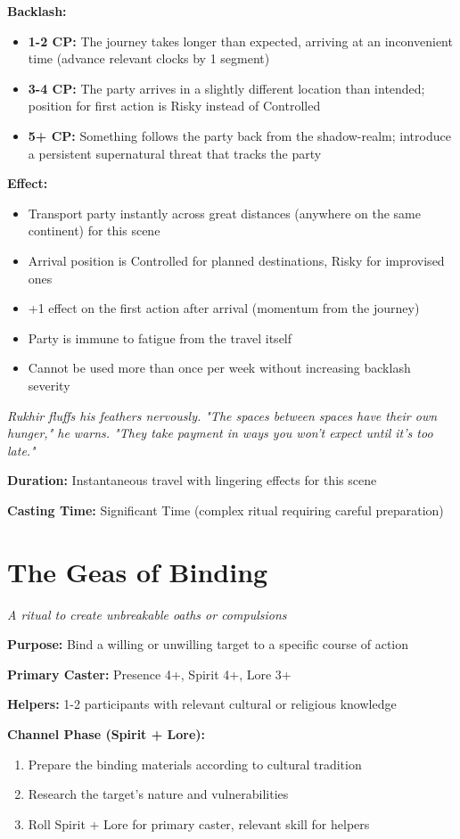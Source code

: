 \documentclass[12pt,twoside]{book}
\newcommand{\shadow}[1]{\textit{#1}}
\begin{document}
\textbf{Backlash:}
\begin{itemize}
\item \textbf{1-2 CP:} The journey takes longer than expected, arriving at an inconvenient time (advance relevant clocks by 1 segment)
\item \textbf{3-4 CP:} The party arrives in a slightly different location than intended; position for first action is Risky instead of Controlled
\item \textbf{5+ CP:} Something follows the party back from the shadow-realm; introduce a persistent supernatural threat that tracks the party
\end{itemize}

\textbf{Effect:}
\begin{itemize}
\item Transport party instantly across great distances (anywhere on the same continent) for this scene
\item Arrival position is Controlled for planned destinations, Risky for improvised ones
\item +1 effect on the first action after arrival (momentum from the journey)
\item Party is immune to fatigue from the travel itself
\item Cannot be used more than once per week without increasing backlash severity
\end{itemize}

\shadow{Rukhir fluffs his feathers nervously. "The spaces between spaces have their own hunger," he warns. "They take payment in ways you won't expect until it's too late."}

\textbf{Duration:} Instantaneous travel with lingering effects for this scene

\textbf{Casting Time:} Significant Time (complex ritual requiring careful preparation)

\section*{The Geas of Binding}
\textit{A ritual to create unbreakable oaths or compulsions}

\textbf{Purpose:} Bind a willing or unwilling target to a specific course of action

\textbf{Primary Caster:} Presence 4+, Spirit 4+, Lore 3+

\textbf{Helpers:} 1-2 participants with relevant cultural or religious knowledge

\textbf{Channel Phase (Spirit + Lore):}
\begin{enumerate}
\item Prepare the binding materials according to cultural tradition
\item Research the target's nature and vulnerabilities
\item Roll Spirit + Lore for primary caster, relevant skill for helpers
\end{enumerate}
\end{document}
